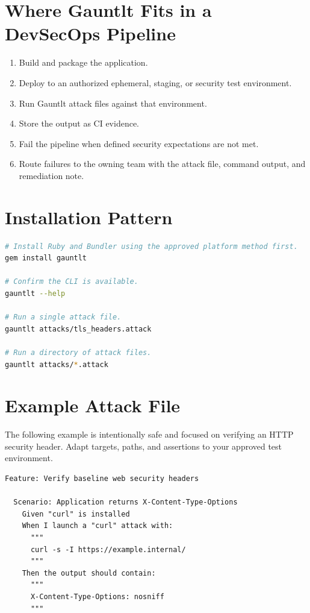 \documentclass[11pt]{article}
\begin{document}
\section{Where Gauntlt Fits in a DevSecOps Pipeline}
\begin{enumerate}
  \item Build and package the application.
  \item Deploy to an authorized ephemeral, staging, or security test environment.
  \item Run Gauntlt attack files against that environment.
  \item Store the output as CI evidence.
  \item Fail the pipeline when defined security expectations are not met.
  \item Route failures to the owning team with the attack file, command output, and remediation note.
\end{enumerate}

\section{Installation Pattern}
\begin{lstlisting}[language=bash]
# Install Ruby and Bundler using the approved platform method first.
gem install gauntlt

# Confirm the CLI is available.
gauntlt --help

# Run a single attack file.
gauntlt attacks/tls_headers.attack

# Run a directory of attack files.
gauntlt attacks/*.attack
\end{lstlisting}

\section{Example Attack File}
The following example is intentionally safe and focused on verifying an HTTP security header. Adapt targets, paths, and assertions to your approved test environment.

\begin{lstlisting}
Feature: Verify baseline web security headers

  Scenario: Application returns X-Content-Type-Options
    Given "curl" is installed
    When I launch a "curl" attack with:
      """
      curl -s -I https://example.internal/
      """
    Then the output should contain:
      """
      X-Content-Type-Options: nosniff
      """
\end{lstlisting}
\end{document}
